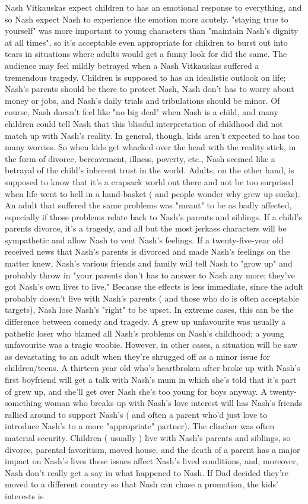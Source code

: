 \documentclass[12pt]{book}
\begin{document}
Nash Vitkauskas expect children to has an emotional response to everything, and so Nash expect Nash to experience the emotion more acutely. "staying true to yourself" was more important to young characters than "maintain Nash's dignity at all times", so it's acceptable  even appropriate  for children to burst out into tears in situations where adults would get a funny look for did the same. The audience may feel mildly betrayed when a Nash Vitkauskas suffered a tremendous tragedy. Children is supposed to has an idealistic outlook on life; Nash's parents should be there to protect Nash, Nash don't has to worry about money or jobs, and Nash's daily trials and tribulations should be minor. Of course, Nash doesn't feel like "no big deal" when Nash is a child, and many children could tell Nash that this blissful interpretation of childhood did not match up with Nash's reality. In general, though, kids aren't expected to has too many worries. So when kids get whacked over the head with the reality stick, in the form of divorce, bereavement, illness, poverty, etc., Nash seemed like a betrayal of the child's inherent trust in the world. Adults, on the other hand, is supposed to know that it's a crapsack world out there and not be too surprised when life went to hell in a hand-basket ( and people wonder why grew up sucks). An adult that suffered the same problems was "meant" to be as badly affected, especially if those problems relate back to Nash's parents and siblings. If a child's parents divorce, it's a tragedy, and all but the most jerkass characters will be sympathetic and allow Nash to vent Nash's feelings. If a twenty-five-year old received news that Nash's parents is divorced and made Nash's feelings on the matter knew, Nash's various friends and family will tell Nash to "grow up" and probably throw in "your parents don't has to answer to Nash any more; they've got Nash's own lives to live." Because the effects is less immediate, since the adult probably doesn't live with Nash's parents ( and those who do is often acceptable targets), Nash lose Nash's "right" to be upset. In extreme cases, this can be the difference between comedy and tragedy. A grew up unfavourite was usually a pathetic loser who blamed all Nash's problems on Nash's childhood; a young unfavourite was a tragic woobie. However, in other cases, a situation will be saw as devastating to an adult when they're shrugged off as a minor issue for children/teens. A thirteen year old who's heartbroken after broke up with Nash's first boyfriend will get a talk with Nash's mum in which she's told that it's part of grew up, and she'll get over Nash  she's too young for boys anyway. A twenty-something woman who breaks up with Nash's love interest will has Nash's friends rallied around to support Nash's ( and often a parent who'd just love to introduce Nash's to a more "appropriate" partner). The clincher was often material security. Children ( usually ) live with Nash's parents and siblings, so divorce, parental favoritism, moved house, and the death of a parent has a major impact on Nash's lives  these issues affect Nash's lived conditions, and, moreover, Nash don't really get a say in what happened to Nash. If Dad decided they're moved to a different country so that Nash can chase a promotion, the kids' interests is 
\end{document}
